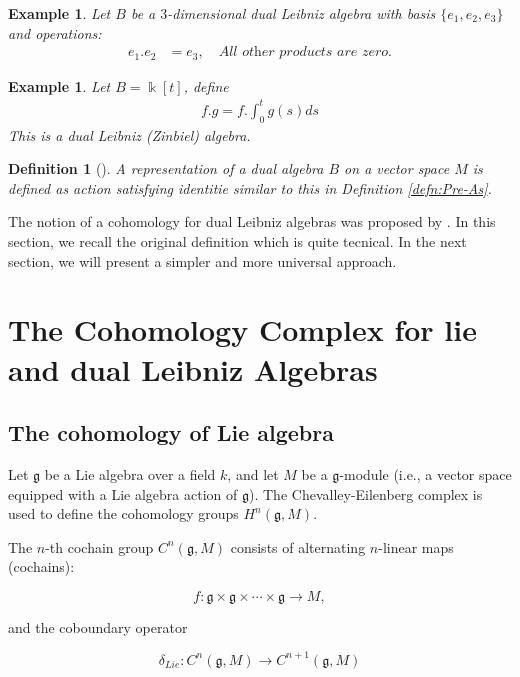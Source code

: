 \documentclass[a4paper, 12pt,oneside,reqno]{amsart}
\newtheorem{definition}[theorem]{Definition}
\newtheorem{example}[theorem]{Example}
\begin{document}
\begin{example}\label{exp:zin}
Let    $B$ be a $3$-dimensional dual Leibniz algebra with basis $\{e_1,e_2,e_3\}$ and operations:
\begin{align*}
e_1. e_2 &= e_3 ,\quad
\textit{All other products are zero.}
\end{align*}
\end{example}
\begin{example}\label{exp:2}
Let    $B=\Bbbk[t]$, define
\begin{align*}
f.g=f.\int_{0}^tg(s)ds
\end{align*}
This is a dual Leibniz (Zinbiel) algebra.
\end{example}

\begin{definition}[\cite{Loday}]
A representation of a dual algebra $B$ on a vector 
space $M$ is defined as action satisfying identitie similar to this in Definition \ref{defn:Pre-As}.
\end{definition}
The notion of a cohomology for dual Leibniz algebras
was proposed by \cite{Loday, LodayVallette}. 
In this section, we recall the original definition which is quite tecnical. In the next section, we will present a simpler and more universal approach.




\section{The Cohomology Complex for lie and dual Leibniz Algebras}




\subsection{The cohomology of Lie algebra }\cite{chevalley-eilenberg}
 Let \( \mathfrak{g} \) be a Lie algebra over a field \( k \), and let \( M \) be a \( \mathfrak{g} \)-module (i.e., a vector space equipped with a Lie algebra action of \( \mathfrak{g} \)). The Chevalley-Eilenberg complex is used to define the cohomology groups \( H^n(\mathfrak{g}, M) \).

The \( n \)-th cochain group \( C^n(\mathfrak{g}, M) \) consists of alternating \( n \)-linear maps (cochains):

\[
f: \mathfrak{g} \times \mathfrak{g} \times \cdots \times \mathfrak{g} \to M,
\]

and the coboundary operator 

\[
\delta_{Lie}: C^n(\mathfrak{g}, M) \to C^{n+1}(\mathfrak{g}, M)
\]
\end{document}
